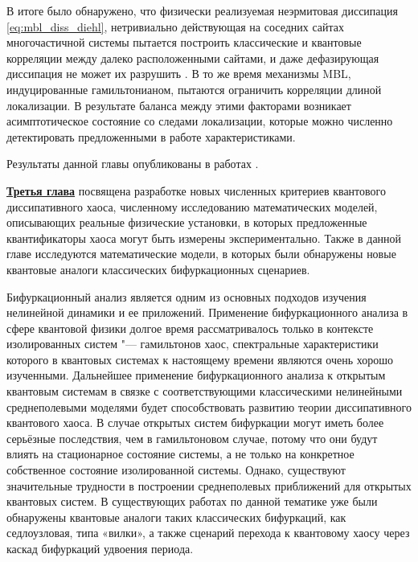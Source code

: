 В итоге было обнаружено, что физически реализуемая неэрмитовая диссипация \cref{eq:mbl_diss_diehl}, нетривиально действующая на соседних сайтах многочастичной системы пытается построить классические и квантовые корреляции между далеко расположенными сайтами, и даже дефазирующая диссипация не может их разрушить \cite{Vakulchyk2018}. 
В то же время механизмы MBL, индуцированные гамильтонианом, пытаются ограничить корреляции длиной локализации. 
В результате баланса между этими факторами возникает асимптотическое состояние со следами локализации, которые можно численно детектировать предложенными в работе характеристиками.  

Результаты данной главы опубликованы в работах \cite{Yusipov2017, Vershinina2017, Yusipov2018, Vakulchyk2018, sessiann_2017, rf_2017, shilnikov_2017}.


\underline{\textbf{Третья глава}} посвящена разработке новых численных критериев квантового диссипативного хаоса, численному исследованию математических моделей, описывающих реальные физические установки, в которых предложенные квантификаторы хаоса могут быть измерены экспериментально. 
Также в данной главе исследуются математические модели, в которых были обнаружены новые квантовые аналоги классических бифуркационных сценариев.

Бифуркационный анализ является одним из основных подходов изучения нелинейной динамики и ее приложений.
Применение бифуркационного анализа в сфере квантовой физики долгое время рассматривалось только в контексте изолированных систем  "---  гамильтонов хаос, спектральные характеристики которого в квантовых системах к настоящему времени являются очень хорошо изученными.
Дальнейшее применение бифуркационного анализа к открытым квантовым системам в связке с соответствующими классическими нелинейными среднеполевыми моделями будет способствовать развитию теории диссипативного квантового хаоса. 
В случае открытых систем бифуркации могут иметь более серьёзные последствия, чем в гамильтоновом случае, потому что они будут влиять на стационарное состояние системы, а не только на конкретное собственное состояние изолированной системы.
Однако, существуют значительные трудности в построении среднеполевых приближений для открытых квантовых систем.
В существующих работах по данной тематике уже были обнаружены квантовые аналоги таких классических бифуркаций, как седлоузловая, типа «вилки», а также сценарий перехода к квантовому хаосу через каскад бифуркаций удвоения периода.

